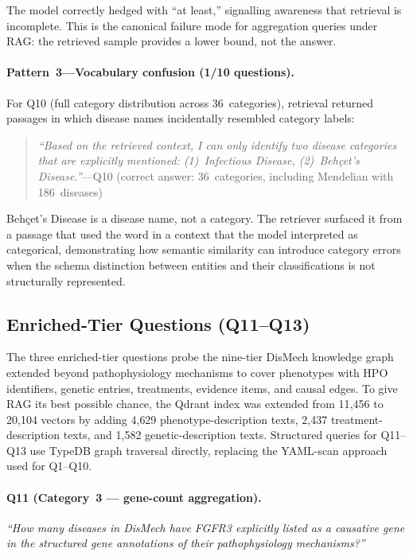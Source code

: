 The model correctly hedged with ``at least,'' signalling awareness that
retrieval is incomplete. This is the canonical failure mode for aggregation
queries under RAG: the retrieved sample provides a lower bound, not the answer.

\paragraph{Pattern~3---Vocabulary confusion (1/10 questions).}
For Q10 (full category distribution across 36~categories), retrieval returned
passages in which disease names incidentally resembled category labels:

\begin{quote}
\emph{``Based on the retrieved context, I can only identify two disease
categories that are explicitly mentioned: (1)~Infectious Disease,
(2)~Beh\c{c}et's Disease.''}\quad---Q10 (correct answer: 36~categories,
including Mendelian with 186~diseases)
\end{quote}

Beh\c{c}et's Disease is a disease name, not a category. The retriever surfaced
it from a passage that used the word in a context that the model interpreted
as categorical, demonstrating how semantic similarity can introduce category
errors when the schema distinction between entities and their classifications
is not structurally represented.

\subsection{Enriched-Tier Questions (Q11--Q13)}
\label{sec:results-enriched}

The three enriched-tier questions probe the nine-tier DisMech knowledge graph
extended beyond pathophysiology mechanisms to cover phenotypes with HPO
identifiers, genetic entries, treatments, evidence items, and causal edges.
To give RAG its best possible chance, the Qdrant index was extended from
11{,}456 to 20{,}104 vectors by adding 4{,}629 phenotype-description texts,
2{,}437 treatment-description texts, and 1{,}582 genetic-description texts.
Structured queries for Q11--Q13 use TypeDB graph traversal directly, replacing
the YAML-scan approach used for Q1--Q10.

\paragraph{Q11 (Category~3 --- gene-count aggregation).}
\textit{``How many diseases in DisMech have FGFR3 explicitly listed as a
causative gene in the structured gene annotations of their pathophysiology
mechanisms?''}

